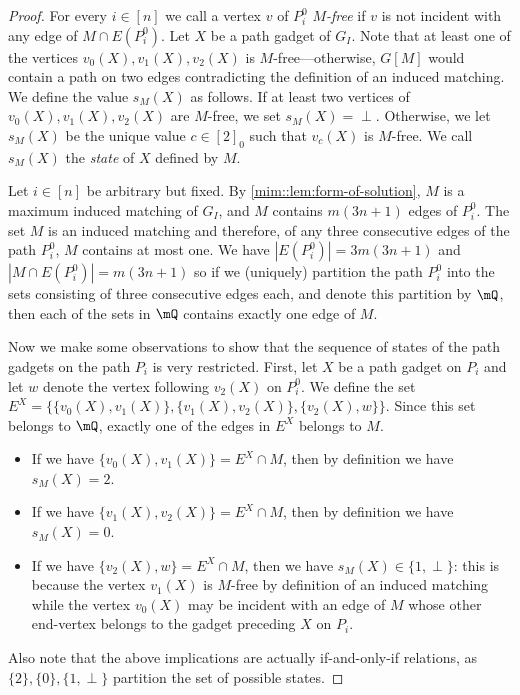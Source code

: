 \documentclass[a4paper,UKenglish,cleveref, autoref, thm-restate]{lipics-v2021}
\begin{document}
\begin{proof}
    For every $i \in [n]$ we call a vertex $v$ of $P_i^0$ \emph{$M$-free} if 
    $v$ is not incident with any edge of $M \cap E(P_i^0)$.
    Let $X$ be a path gadget of $G_I$.
    Note that at least one of the vertices $v_0(X), v_1(X), v_2(X)$ is $M$-free---otherwise, $G[M]$ would contain a path on two edges contradicting the definition of an induced matching.
    We define the value $s_M(X)$ as follows.
    If at least two vertices of $v_0(X), v_1(X), v_2(X)$ are $M$-free, we set $s_M(X)=\perp$.
    Otherwise, we let $s_M(X)$ be the unique value $c \in [2]_0$ such that $v_c(X)$ is $M$-free.
    We call $s_M(X)$ the \emph{state} of $X$ defined by $M$.
    
    Let $i \in [n]$ be arbitrary but fixed.
    By \cref{mim::lem:form-of-solution}, $M$ is a maximum induced matching of $G_I$, and $M$ contains $m(3n+1)$ edges of $P_i^0$. 
    The set $M$ is an induced matching and therefore, of any three consecutive edges of the path $P_i^0$, $M$ contains at most one.
    We have $|E(P_i^0)| = 3m(3n+1)$ and $|M \cap E(P_i^0)| = m(3n+1)$ so if we (uniquely) partition the path $P_i^0$ into the sets consisting of three consecutive edges each, and denote this partition by $\mQ$, then each of the sets in $\mQ$ contains exactly one edge of $M$.
    
    Now we make some observations to show that the sequence of states of the path gadgets on the path $P_i$ is very restricted. 
    First, let $X$ be a path gadget on $P_i$ and let $w$ denote the vertex following $v_2(X)$ on $P_i^0$.
    We define the set $E^X = \{\{v_0(X), v_1(X)\}, \{v_1(X), v_2(X)\}, \{v_2(X), w\}\}$.
    Since this set belongs to $\mQ$, exactly one of the edges in $E^X$ belongs to $M$.
    \begin{itemize}
        \item If we have $\{v_0(X), v_1(X)\} = E^X \cap M$, then by definition we have $s_M(X) = 2$.
        \item If we have $\{v_1(X), v_2(X)\} = E^X \cap M$, then by definition we have $s_M(X) = 0$.
        \item If we have $\{v_2(X), w\} = E^X \cap M$, then 
        we have $s_M(X) \in \{1, \perp\}$: this is because the vertex $v_1(X)$ is $M$-free by definition of an induced matching while the vertex $v_0(X)$ may be incident with an edge of $M$ whose other end-vertex belongs to the gadget preceding $X$ on $P_i$.
    \end{itemize}
    Also note that the above implications are actually if-and-only-if relations, as $\{2\}, \{0\}, \{1, \perp\}$ partition the set of possible states.
    

\end{proof}
\end{document}
